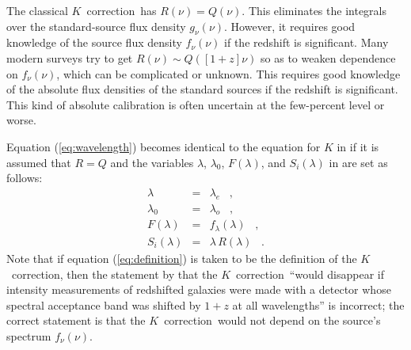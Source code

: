 \documentclass[preprint]{aastex}
\newcommand{\kcorrection}{$K$~correction}
\newcommand{\lambdaobs}{\lambda_o}
\newcommand{\lambdaemit}{\lambda_e}
\begin{document}
The classical \kcorrection\ has $R(\nu)=Q(\nu)$.  This eliminates the
integrals over the standard-source flux density $g_{\nu}(\nu)$.
However, it requires good knowledge of the source flux density
$f_{\nu}(\nu)$ if the redshift is significant.  Many modern surveys
try to get $R(\nu)\sim Q([1+z]\nu)$ so as to weaken dependence on
$f_{\nu}(\nu)$, which can be complicated or unknown.  This requires
good knowledge of the absolute flux densities of the standard sources
if the redshift is significant.  This kind of absolute calibration is
often uncertain at the few-percent level or worse.

Equation (\ref{eq:wavelength}) becomes identical to the equation for
$K$ in \citet{oke68a} if it is assumed that $R=Q$ and the variables
$\lambda$, $\lambda_0$, $F(\lambda)$, and $S_i(\lambda)$ in
\citet{oke68a} are set as follows:
\begin{eqnarray}\displaystyle
\lambda & = & \lambdaemit \;\;\;, \nonumber \\
\lambda_0 & = & \lambdaobs \;\;\;, \nonumber \\
F(\lambda) & = & f_{\lambda}(\lambda) \;\;\;, \nonumber \\
S_i(\lambda) & = & \lambda\,R(\lambda) \;\;\;.
\end{eqnarray}
Note that if equation (\ref{eq:definition}) is taken to be the
definition of the \kcorrection, then the statement by \citet{oke68a}
that the \kcorrection\ ``would disappear if intensity measurements of
redshifted galaxies were made with a detector whose spectral
acceptance band was shifted by $1+z$ at all wavelengths'' is
incorrect; the correct statement is that the \kcorrection\ would not
depend on the source's spectrum $f_{\nu}(\nu)$.



\end{document}
